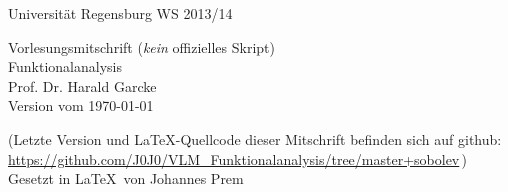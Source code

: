 \begin{titlepage}
    \Large
        Universität Regensburg \hfill WS 2013/14 \\
    \vspace{4cm}
    \begin{center}
        \small
        Vorlesungsmitschrift (\emph{kein} offizielles Skript)\\[1cm]
        \Huge 
            Funktionalanalysis\\[2cm]
        \Large
            Prof. Dr. Harald Garcke\\
        \vfill
        \small
            Version vom \today
        
        \footnotesize
        \smallskip
            (Letzte Version und \LaTeX-Quellcode dieser Mitschrift befinden
            sich auf github: 
            \url{https://github.com/J0J0/VLM_Funktionalanalysis/tree/master+sobolev}\,)%
        \\[2cm]
        \small
            Gesetzt in \LaTeX\ von Johannes Prem
        \vspace*{1cm}
    \end{center}
\end{titlepage}

